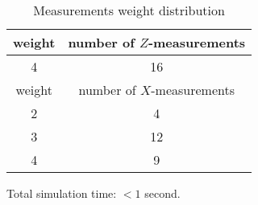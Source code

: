 \documentclass[12pt]{article}
\begin{document}
\begin{table}[h]
\centering
\begin{tabular}{c c}
\hline
weight & number of $Z$-measurements\\
\hline
4 & 16\\
\hline
\hline
weight & number of $X$-measurements\\
\hline
2 & 4\\
3 & 12\\
4 & 9\\
\hline
\end{tabular}
\caption{Measurements weight distribution}
\end{table}
\vspace{.3cm}



\vspace{2cm}
Total simulation time: $< 1$ second.
\end{document}
